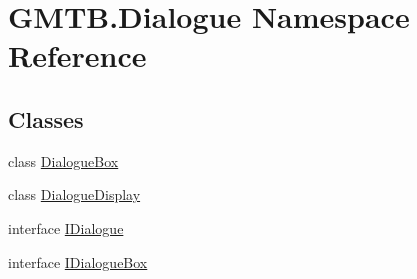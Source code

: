 \hypertarget{namespace_g_m_t_b_1_1_dialogue}{}\section{G\+M\+T\+B.\+Dialogue Namespace Reference}
\label{namespace_g_m_t_b_1_1_dialogue}
\subsection*{Classes}
\begin{DoxyCompactItemize}
\item 
class \mbox{\hyperlink{class_g_m_t_b_1_1_dialogue_1_1_dialogue_box}{Dialogue\+Box}}
\item 
class \mbox{\hyperlink{class_g_m_t_b_1_1_dialogue_1_1_dialogue_display}{Dialogue\+Display}}
\item 
interface \mbox{\hyperlink{interface_g_m_t_b_1_1_dialogue_1_1_i_dialogue}{I\+Dialogue}}
\item 
interface \mbox{\hyperlink{interface_g_m_t_b_1_1_dialogue_1_1_i_dialogue_box}{I\+Dialogue\+Box}}
\end{DoxyCompactItemize}
